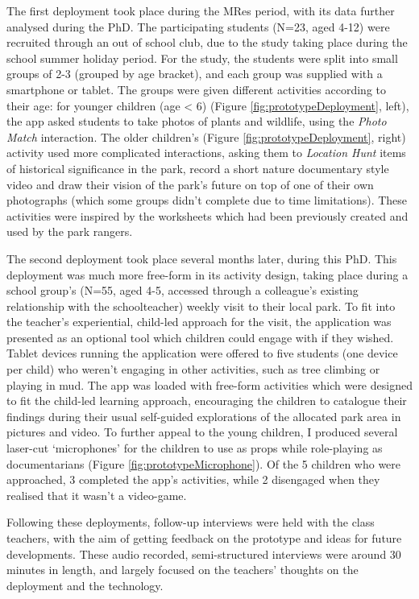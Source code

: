 The first deployment took place during the MRes period, with its data further analysed during the PhD. The participating students (N=23, aged 4-12) were recruited through an out of school club, due to the study taking place during the school summer holiday period. For the study, the students were split into small groups of 2-3 (grouped by age bracket), and each group was supplied with a smartphone or tablet. The groups were given different activities according to their age: for younger children (age < 6) (Figure \ref{fig:prototypeDeployment}, left), the app asked students to take photos of plants and wildlife, using the \textit{Photo Match} interaction. The older children's (Figure \ref{fig:prototypeDeployment}, right) activity used more complicated interactions, asking them to \textit{Location Hunt} items of historical significance in the park, record a short nature documentary style video and draw their vision of the park’s future on top of one of their own photographs (which some groups didn’t complete due to time limitations). These activities were inspired by the worksheets which had been previously created and used by the park rangers.

The second deployment took place several months later, during this PhD. This deployment was much more free-form in its activity design, taking place during a school group’s (N=55, aged 4-5, accessed through a colleague's existing relationship with the schoolteacher) weekly visit to their local park. To fit into the teacher’s experiential, child-led approach for the visit, the application was presented as an optional tool which children could engage with if they wished. Tablet devices running the application were offered to five students (one device per child) who weren't engaging in other activities, such as tree climbing or playing in mud. The app was loaded with free-form activities which were designed to fit the child-led learning approach, encouraging the children to catalogue their findings during their usual self-guided explorations of the allocated park area in pictures and video. To further appeal to the young children, I produced several laser-cut `microphones' for the children to use as props while role-playing as documentarians (Figure \ref{fig:prototypeMicrophone}). Of the 5 children who were approached, 3 completed the app’s activities, while 2 disengaged when they realised that it wasn't a video-game.

Following these deployments, follow-up interviews were held with the class teachers, with the aim of getting feedback on the prototype and ideas for future developments. These audio recorded, semi-structured interviews were around 30 minutes in length, and largely focused on the teachers' thoughts on the deployment and the technology.

